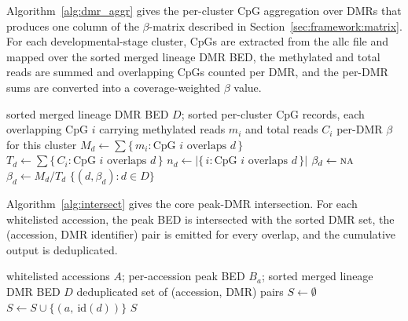 \documentclass[sigconf,nonacm]{acmart}
\begin{document}
Algorithm~\ref{alg:dmr_aggr} gives the per-cluster CpG aggregation
over DMRs that produces one column of the $\beta$-matrix described in
Section~\ref{sec:framework:matrix}. For each developmental-stage
cluster, CpGs are extracted from the allc file and mapped over the
sorted merged lineage DMR BED, the methylated and total reads are
summed and overlapping CpGs counted per DMR, and the per-DMR sums
are converted into a coverage-weighted $\beta$ value.

\begin{algorithm}[t]
\caption{Per-cluster coverage-weighted $\beta$ over the merged
  lineage DMR BED (implemented in \texttt{apm\_<lineage>\_DMR.sh}).}
\label{alg:dmr_aggr}
\begin{algorithmic}[1]
\Require sorted merged lineage DMR BED $D$; sorted per-cluster CpG
  records, each overlapping CpG $i$ carrying methylated reads $m_i$
  and total reads $C_i$
\Ensure per-DMR $\beta$ for this cluster
  \State $M_d \gets \sum \{\, m_i : \text{CpG } i \text{ overlaps } d \,\}$
  \State $T_d \gets \sum \{\, C_i : \text{CpG } i \text{ overlaps } d \,\}$
  \State $n_d \gets |\{\, i : \text{CpG } i \text{ overlaps } d \,\}|$
    \State $\beta_d \gets \textsc{na}$
  \Else
    \State $\beta_d \gets M_d / T_d$
  \EndIf
\EndFor
\State \Return $\{(d, \beta_d) : d \in D\}$
\end{algorithmic}
\end{algorithm}

Algorithm~\ref{alg:intersect} gives the core peak-DMR intersection.
For each whitelisted accession, the peak BED is intersected with the
sorted DMR set, the (accession, DMR identifier) pair is emitted for
every overlap, and the cumulative output is deduplicated.

\begin{algorithm}[t]
\caption{Peak-DMR intersection (implemented in
  \texttt{regenerate\_tf\_dmr.sh}).}
\label{alg:intersect}
\begin{algorithmic}[1]
\Require whitelisted accessions $A$; per-accession peak BED $B_a$;
  sorted merged lineage DMR BED $D$
\Ensure deduplicated set of (accession, DMR) pairs
\State $S \gets \emptyset$
    \State $S \gets S \cup \{(a,\ \mathrm{id}(d))\}$
  \EndFor
\EndFor
\State \Return $S$
\end{algorithmic}
\end{algorithm}
\end{document}
